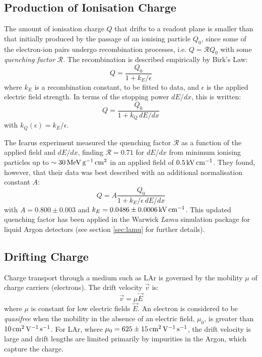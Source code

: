 \subsection{Production of Ionisation Charge}\label{sec:production-ionisation-charge}
The amount of ionisation charge $Q$ that drifts to a readout plane is smaller than that initially produced by the passage of an ionising particle $Q_0$, since some of the electron-ion pairs undergo recombination processes, i.e. $Q = \mathcal{R}Q_0$ with some \emph{quenching factor} $\mathcal{R}$. The recombination is described empirically by Birk's Law\citep{Birks1964}:
\begin{equation}\label{eqn:birks_law}
    Q = \frac{Q_0}{1 + k_E / \epsilon}
\end{equation}
where $k_E$ is a recombination constant, to be fitted to data, and $\epsilon$ is the applied electric field strength. In terms of the stopping power $dE/dx$, this is written:
\begin{equation}\label{eqn:birks_law_dEdx}
    Q = \frac{Q_0}{1 + k_Q\, dE/dx}
\end{equation}
with $k_Q(\epsilon) = k_E / \epsilon$.

The {\sc Icarus} experiment\citep{Amoruso2004} measured the quenching factor $\mathcal{R}$ as a function of the applied field and $dE/dx$, finding $\mathcal{R} = 0.71$ for $dE/dx$ from minimum ionising particles up to $\sim 30 \,\mathrm{MeV} \,\mathrm{g}^{-1} \,\mathrm{cm}^2$ in an applied field of $0.5 \,\mathrm{kV} \,\mathrm{cm}^{-1}$. They found, however, that their data was best described with an additional normalisation constant $A$:
\begin{equation}\label{eqn:icarus_quenching}
Q = A\frac{Q_0}{1 + k_E/\epsilon \, dE/dx}
\end{equation}
with $A=0.800\pm0.003$ and $k_E = 0.0486\pm 0.0006 \,\mathrm{kV} \,\mathrm{cm}^{-1}$. This updated quenching factor has been applied in the Warwick \emph{Lamu} simulation package for liquid Argon detectors (see section \ref{sec:lamu} for further details).

\subsection{Drifting Charge}
Charge transport through a medium such as \ac{LAr} is governed by the mobility $\mu$ of charge carriers (electrons)\citep{Aprile2006}. The drift velocity $\vec{v}$ is:
\begin{equation}\label{eqn:charge_transport}
    \vec{v} = \mu \vec{E}
\end{equation}
where $\mu$ is constant for low electric fields $\vec{E}$. An electron is considered to be \emph{quasifree} when the mobility in the absence of an electric field, $\mu_0$, is greater than $10 \,\mathrm{cm}^2 \,\mathrm{V}^{-1} \,\mathrm{s}^{-1}$. For \ac{LAr}, where $\mu_0 = 625 \pm 15 \,\mathrm{cm}^2 \,\mathrm{V}^{-1} \,\mathrm{s}^{-1}$\citep{Aprile2006}, the drift velocity is large and drift lengths are limited primarily by impurities in the Argon, which capture the charge.

